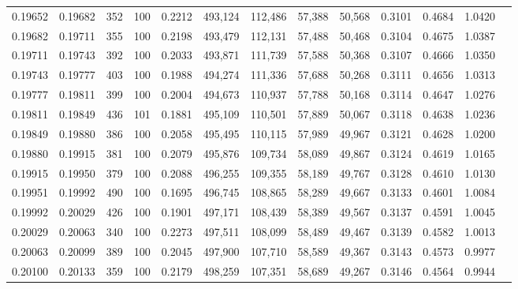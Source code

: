 \begin{tabular}{rrrrrrrrrrrrr}
0.19652 & 0.19682 &   352 & 100 &                                     0.2212 & 493,124 & 112,486 &  57,388 &  50,568 & 0.3101 & 0.4684 & 1.0420 \\
0.19682 & 0.19711 &   355 & 100 &                                     0.2198 & 493,479 & 112,131 &  57,488 &  50,468 & 0.3104 & 0.4675 & 1.0387 \\
0.19711 & 0.19743 &   392 & 100 &                                     0.2033 & 493,871 & 111,739 &  57,588 &  50,368 & 0.3107 & 0.4666 & 1.0350 \\
0.19743 & 0.19777 &   403 & 100 &                                     0.1988 & 494,274 & 111,336 &  57,688 &  50,268 & 0.3111 & 0.4656 & 1.0313 \\
0.19777 & 0.19811 &   399 & 100 &                                     0.2004 & 494,673 & 110,937 &  57,788 &  50,168 & 0.3114 & 0.4647 & 1.0276 \\
0.19811 & 0.19849 &   436 & 101 &                                     0.1881 & 495,109 & 110,501 &  57,889 &  50,067 & 0.3118 & 0.4638 & 1.0236 \\
0.19849 & 0.19880 &   386 & 100 &                                     0.2058 & 495,495 & 110,115 &  57,989 &  49,967 & 0.3121 & 0.4628 & 1.0200 \\
0.19880 & 0.19915 &   381 & 100 &                                     0.2079 & 495,876 & 109,734 &  58,089 &  49,867 & 0.3124 & 0.4619 & 1.0165 \\
0.19915 & 0.19950 &   379 & 100 &                                     0.2088 & 496,255 & 109,355 &  58,189 &  49,767 & 0.3128 & 0.4610 & 1.0130 \\
0.19951 & 0.19992 &   490 & 100 &                                     0.1695 & 496,745 & 108,865 &  58,289 &  49,667 & 0.3133 & 0.4601 & 1.0084 \\
0.19992 & 0.20029 &   426 & 100 &                                     0.1901 & 497,171 & 108,439 &  58,389 &  49,567 & 0.3137 & 0.4591 & 1.0045 \\
0.20029 & 0.20063 &   340 & 100 &                                     0.2273 & 497,511 & 108,099 &  58,489 &  49,467 & 0.3139 & 0.4582 & 1.0013 \\
0.20063 & 0.20099 &   389 & 100 &                                     0.2045 & 497,900 & 107,710 &  58,589 &  49,367 & 0.3143 & 0.4573 & 0.9977 \\
0.20100 & 0.20133 &   359 & 100 &                                     0.2179 & 498,259 & 107,351 &  58,689 &  49,267 & 0.3146 & 0.4564 & 0.9944 \\

\end{tabular}
